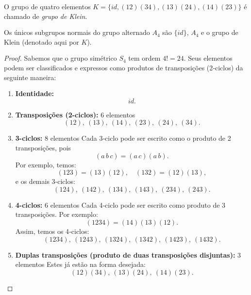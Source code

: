 \documentclass[11pt,openany]{book}
\newenvironment{novo}{
    \color{red}
}{}
\begin{document}
\begin{definition}
\label{def:klein_group}
    \begin{novo}
    O grupo de quatro elementos $K = \{id, (12)(34), (13)(24), (14)(23)\}$ é chamado de \textit{grupo de Klein}.
    \end{novo}
\end{definition}

\begin{theorem}
\label{klein_subgrupos}
    \begin{novo}
    Os únicos subgrupos normais do grupo alternado $A_4$ são $\{id\}$, $A_4$ e o grupo de Klein (denotado aqui por $K$). 
    \end{novo}
\end{theorem}

\begin{novo}
\begin{proof}
    Sabemos que o grupo simétrico \(S_4\) tem ordem $4! = 24$. Seus elementos podem ser classificados e expressos como produtos de transposições (2‑ciclos) da seguinte maneira:

    \begin{enumerate}
        \item \textbf{Identidade:}  
        \[
        id.
        \]
        
        \item \textbf{Transposições (2-ciclos):} 6 elementos  
        \[
        (12),\ (13),\ (14),\ (23),\ (24),\ (34).
        \]
        
        \item \textbf{3-ciclos:} 8 elementos  
        Cada 3‑ciclo pode ser escrito como o produto de 2 transposições, pois
        \[
        (a\,b\,c)=(a\,c)(a\,b).
        \]
        Por exemplo, temos:
        \[
        (123)=(13)(12),\quad (132)=(12)(13),
        \]
        e os demais 3‑ciclos:
        \[
        (124),\ (142),\ (134),\ (143),\ (234),\ (243).
        \]
        
        \item \textbf{4-ciclos:} 6 elementos  
        Cada 4‑ciclo pode ser escrito como produto de 3 transposições. Por exemplo:
        \[
        (1234)=(14)(13)(12).
        \]
        Assim, temos os 4‑ciclos:
        \[
        (1234),\ (1243),\ (1324),\ (1342),\ (1423),\ (1432).
        \]
        
        \item \textbf{Duplas transposições (produto de duas transposições disjuntas):} 3 elementos  
        Estes já estão na forma desejada:
        \[
        (12)(34),\ (13)(24),\ (14)(23).
        \]
    \end{enumerate}


\end{proof}
\end{novo}
\end{document}
